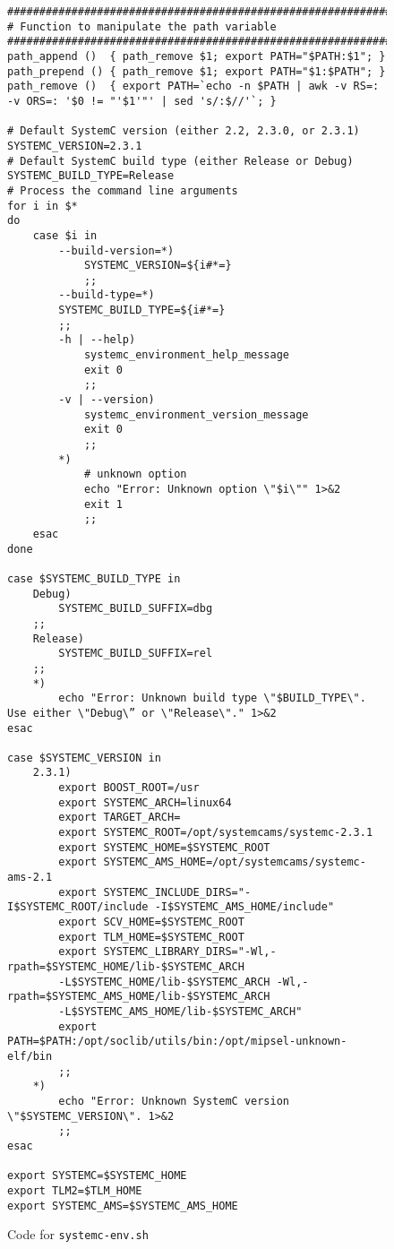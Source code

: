 \begin{figure}[htb]
\begin{verbatim}
########################################################################
# Function to manipulate the path variable
########################################################################
path_append ()  { path_remove $1; export PATH="$PATH:$1"; }
path_prepend () { path_remove $1; export PATH="$1:$PATH"; }
path_remove ()  { export PATH=`echo -n $PATH | awk -v RS=: -v ORS=: '$0 != "'$1'"' | sed 's/:$//'`; }

# Default SystemC version (either 2.2, 2.3.0, or 2.3.1)
SYSTEMC_VERSION=2.3.1
# Default SystemC build type (either Release or Debug)
SYSTEMC_BUILD_TYPE=Release
# Process the command line arguments
for i in $*
do
    case $i in
        --build-version=*)
            SYSTEMC_VERSION=${i#*=}
            ;;
    	--build-type=*)
	    SYSTEMC_BUILD_TYPE=${i#*=}
	    ;;
        -h | --help)
            systemc_environment_help_message
            exit 0
            ;;
        -v | --version)
            systemc_environment_version_message
            exit 0
            ;;
    	*)
            # unknown option
            echo "Error: Unknown option \"$i\"" 1>&2
            exit 1
            ;;
    esac
done

case $SYSTEMC_BUILD_TYPE in
    Debug)
        SYSTEMC_BUILD_SUFFIX=dbg
    ;;
    Release)
        SYSTEMC_BUILD_SUFFIX=rel
    ;;
    *)
        echo "Error: Unknown build type \"$BUILD_TYPE\". Use either \"Debug\” or \"Release\"." 1>&2
esac

case $SYSTEMC_VERSION in
    2.3.1)
        export BOOST_ROOT=/usr
        export SYSTEMC_ARCH=linux64
        export TARGET_ARCH=        
 	    export SYSTEMC_ROOT=/opt/systemcams/systemc-2.3.1 
        export SYSTEMC_HOME=$SYSTEMC_ROOT
 	    export SYSTEMC_AMS_HOME=/opt/systemcams/systemc-ams-2.1      
  	    export SYSTEMC_INCLUDE_DIRS="-I$SYSTEMC_ROOT/include -I$SYSTEMC_AMS_HOME/include"
        export SCV_HOME=$SYSTEMC_ROOT
        export TLM_HOME=$SYSTEMC_ROOT
        export SYSTEMC_LIBRARY_DIRS="-Wl,-rpath=$SYSTEMC_HOME/lib-$SYSTEMC_ARCH
        -L$SYSTEMC_HOME/lib-$SYSTEMC_ARCH -Wl,-rpath=$SYSTEMC_AMS_HOME/lib-$SYSTEMC_ARCH
        -L$SYSTEMC_AMS_HOME/lib-$SYSTEMC_ARCH"
	    export PATH=$PATH:/opt/soclib/utils/bin:/opt/mipsel-unknown-elf/bin
        ;;
    *)
        echo "Error: Unknown SystemC version \"$SYSTEMC_VERSION\". 1>&2
        ;;
esac

export SYSTEMC=$SYSTEMC_HOME
export TLM2=$TLM_HOME
export SYSTEMC_AMS=$SYSTEMC_AMS_HOME
\end{verbatim}
  \caption{Code for \texttt{systemc-env.sh}}
  \label{code:systemc-env}
\end{figure}
